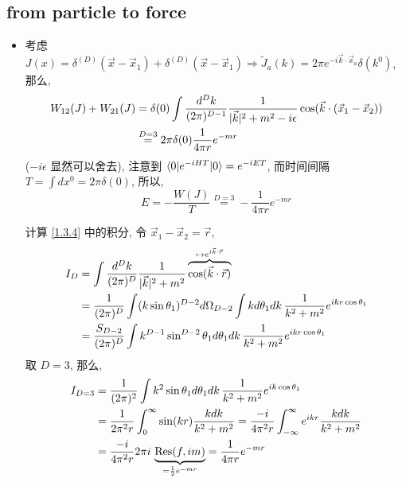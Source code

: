 \subsection{from particle to force}
\begin{itemize}
	\item 考虑 $J(x) = \delta^{(D)}(\vec{x} - \vec{x}_1) + \delta^{(D)}(\vec{x} - \vec{x}_1) \Longrightarrow \tilde{J}_a(k) = 2 \pi e^{- i \vec{k} \cdot \vec{x}_a} \delta(k^0)$, 那么,
	\begin{align}
		W_{1 2}(J) + W_{2 1}(J) &= \delta(0) \int \frac{d^D k}{(2 \pi)^{D - 1}} \frac{1}{|\vec{k}|^2 + m^2 - i \epsilon} \cos(\vec{k} \cdot (\vec{x}_1 - \vec{x}_2)) \notag \\
		&\overset{D = 3}{=} 2 \pi \delta(0) \frac{1}{4 \pi r} e^{- m r} \label{1.3.4}
	\end{align}
	($- i \epsilon$ 显然可以舍去), 注意到 $\braket{0 | e^{- i H T} | 0} = e^{- i E T}$, 而时间间隔 $T = \int dx^0 = 2 \pi \delta(0)$, 所以,
	\begin{equation}
		E = - \frac{W(J)}{T} \overset{D = 3}{=} - \frac{1}{4 \pi r} e^{- m r}
	\end{equation}
	
	\begin{tcolorbox}[title=calculation:]
		计算 \eqref{1.3.4} 中的积分, 令 $\vec{x}_1 - \vec{x}_2 = \vec{r}$,
		\begin{align}
			I_D &= \int \frac{d^D k}{(2 \pi)^D} \frac{1}{|\vec{k}|^2 + m^2} \overbrace{\cos(\vec{k} \cdot \vec{r})}^{\mapsto e^{i \vec{k} \cdot \vec{r}}} \notag \\
			&= \frac{1}{(2 \pi)^D} \int (k \sin \theta_1)^{D - 2} d\Omega_{D - 2} \int k d\theta_1 dk \, \frac{1}{k^2 + m^2} e^{i k r \cos \theta_1} \notag \\
			&= \frac{S_{D - 2}}{(2 \pi)^D} \int k^{D - 1} \sin^{D - 2} \theta_1 d\theta_1 dk \, \frac{1}{k^2 + m^2} e^{i k r \cos \theta_1}
		\end{align}
		取 $D = 3$, 那么,
		\begin{align}
			I_{D = 3} &= \frac{1}{(2 \pi)^2} \int k^2 \sin \theta_1 d\theta_1 dk \, \frac{1}{k^2 + m^2} e^{i k \cos \theta_1} \notag \\
			&= \frac{1}{2 \pi^2 r} \int_0^\infty \sin(k r) \frac{k dk}{k^2 + m^2} = \frac{- i}{4 \pi^2 r} \int_{- \infty}^\infty e^{i k r} \frac{k dk}{k^2 + m^2} \notag \\
			&= \frac{- i}{4 \pi^2 r} 2 \pi i \, \underbrace{\mathrm{Res}(f, i m)}_{= \frac{1}{2} e^{- m r}} = \frac{1}{4 \pi r} e^{- m r}
		\end{align}
	\end{tcolorbox}
\end{itemize}


